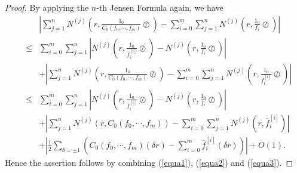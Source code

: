\documentclass{article}
\begin{document}
\begin{proof}
By applying the $n$-th Jensen Formula again, we have
\begin{eqnarray}\label{equa3}
        &&\left|\sum_{j=1}^{n}N^{(j)}\left(r, \frac{1_{0}}{C_{0}(f_{0}, \cdots, f_{m})}\oslash\right)-\sum_{i=0}^{m}\sum_{j=1}^{n}N^{(j)}\left(r, \frac{1_{0}}{f_{i}}\oslash\right)\right|\nonumber\\
        &\leq&\sum_{i=0}^{m}\sum_{j=1}^{n}\left|N^{(j)}\left(r, \frac{1_{0}}{\overline{f}_{i}^{[i]}}\oslash\right)-N^{(j)}\left(r, \frac{1_{0}}{f_{i}}\oslash\right)\right|\nonumber\\
        &&+\left|\sum_{j=1}^{n}N^{(j)}\left(r, \frac{1_{0}}{C_{0}(f_{0}, \cdots, f_{m})}\oslash\right)-\sum_{i=0}^{m}\sum_{j=1}^{n}N^{(j)}\left(r, \frac{1_{0}}{\overline{f}_{i}^{[i]}}\oslash\right)\right|\nonumber\\
        &\leq&\sum_{i=0}^{m}\sum_{j=1}^{n}\left|N^{(j)}\left(r, \frac{1_{0}}{\overline{f}_{i}^{[i]}}\oslash\right)-N^{(j)}\left(r, \frac{1_{0}}{f_{i}}\oslash\right)\right|\nonumber\\
        &&+\left|\sum_{j=1}^{n}N^{(j)}\left(r, C_{0}(f_{0}, \cdots, f_{m})\right)-\sum_{i=0}^{m}\sum_{j=1}^{n}N^{(j)}\left(r, \overline{f}_{i}^{[i]}\right)\right|\nonumber\\
        &&+\left|\frac{1}{2}\sum_{\delta=\pm 1}\left(C_{0}(f_{0}, \cdots, f_{m})(\delta r)-\sum_{i=0}^{m}\overline{f}_{i}^{[i]}(\delta r)\right)\right|+O(1).
    \end{eqnarray}
    Hence the assertion follows by combining (\ref{equa1}), (\ref{equa2}) and (\ref{equa3}).
\end{proof}
\end{document}
